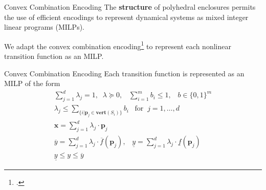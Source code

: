 \begin{frame}[fragile]{Convex Combination Encoding}
    The \textbf{structure} of polyhedral enclosures permits the use of efficient encodings to represent dynamical systems as mixed integer linear programs (MILPs).

    \vspace{0.5cm}

    We adapt the convex combination encoding\footcite{geissler2011using} to represent each nonlinear transition function as an MILP.
\end{frame}

\begin{frame}[fragile]{Convex Combination Encoding}
    Each transition function is represented as an MILP of the form
    \begin{subequations}
    \begin{gather}
        \sum_{j = 1}^{d} \lambda_j = 1, \;\; \lambda \succcurlyeq 0, \;\;\; \sum_{i = 1}^m b_i \leq 1,  \;\;\; b \in \{0,1\}^m \label{eq:cc1}\\
        \lambda_j \leq \sum_{\{i|\mathbf{p}_j \in \mathbf{vert}(S_i)\}} b_i \;\;\; \text{for} \;\; j = 1,\dots,d \label{eq:cc2} \\
        \mathbf{x} = \sum_{j = 1}^{d} \lambda_j \cdot\mathbf{p}_j \label{eq:cc3} \\
        \overline{y} = \sum_{j = 1}^{d} \lambda_j \cdot \overline{f}(\mathbf{p}_j), \;\;\;
        \underline{y} = \sum_{j = 1}^{d} \lambda_j \cdot \underline{f}(\mathbf{p}_j) \label{eq:cc4}\\ 
        \underline{y} \leq y \leq \overline{y} \label{eq:cc5}
    \end{gather}
\end{subequations}
\end{frame}

